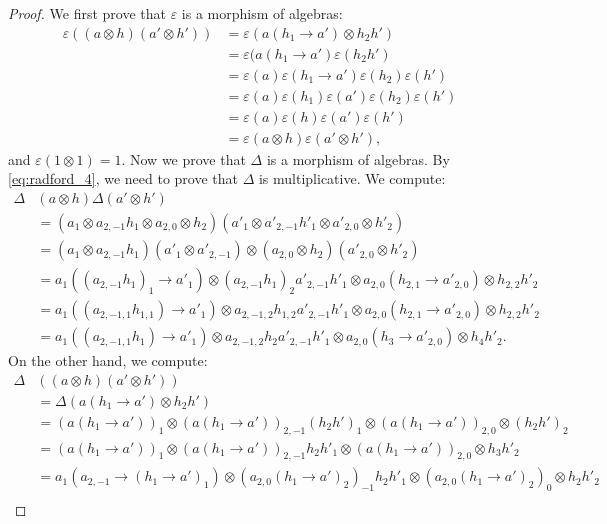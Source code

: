 \begin{proof}
We first prove that $\varepsilon$ is a morphism of algebras: 
\begin{align*}
\varepsilon((a\otimes h)(a'\otimes h')) & =\varepsilon(a(h_{1}\to a')\otimes h_{2}h')\\
 & =\varepsilon(a(h_{1}\to a')\varepsilon(h_{2}h')\\
 & =\varepsilon(a)\varepsilon(h_{1}\to a')\varepsilon(h_{2})\varepsilon(h')\\
 & =\varepsilon(a)\varepsilon(h_{1})\varepsilon(a')\varepsilon(h_{2})\varepsilon(h')\\
 & =\varepsilon(a)\varepsilon(h)\varepsilon(a')\varepsilon(h')\\
 & =\varepsilon(a\otimes h)\varepsilon(a'\otimes h'),
 \end{align*}
and $\varepsilon(1\otimes1)=1$.  Now we prove that $\Delta$ is a morphism of
algebras. By \eqref{eq:radford_4}, we need to prove that $\Delta$ is
multiplicative. We compute:
\begin{align*}
\Delta & (a\otimes h)\Delta(a'\otimes h')\\
 & =(a_{1}\otimes a_{2,-1}h_{1}\otimes a_{2,0}\otimes h_{2})(a'_{1}\otimes a'_{2,-1}h'_{1}\otimes a'_{2,0}\otimes h'_{2})\\
 & =(a_{1}\otimes a_{2,-1}h_{1})(a'_{1}\otimes a'_{2,-1})\otimes(a_{2,0}\otimes h_{2})(a'_{2,0}\otimes h'_{2})\\
 & =a_{1}((a_{2,-1}h_{1})_{1}\to a'_{1})\otimes(a_{2,-1}h_{1})_{2}a'_{2,-1}h'_{1}\otimes a_{2,0}(h_{2,1}\to a'_{2,0})\otimes h_{2,2}h'_{2}\\
 & =a_{1}((a_{2,-1,1}h_{1,1})\to a'_{1})\otimes a_{2,-1,2}h_{1,2}a'_{2,-1}h'_{1}\otimes a_{2,0}(h_{2,1}\to a'_{2,0})\otimes h_{2,2}h'_{2}\\
 & =a_{1}((a_{2,-1,1}h_{1})\to a'_{1})\otimes a_{2,-1,2}h_{2}a'_{2,-1}h'_{1}\otimes a_{2,0}(h_{3}\to a'_{2,0})\otimes h_{4}h'_{2}.\end{align*}
On the other hand, we compute:
\begin{align*}
\Delta & ((a\otimes h)(a'\otimes h'))\\
 & =\Delta(a(h_{1}\to a')\otimes h_{2}h')\\
 & =(a(h_{1}\to a'))_{1}\otimes(a(h_{1}\to a'))_{2,-1}(h_{2}h')_{1}\otimes(a(h_{1}\to a'))_{2,0}\otimes(h_{2}h')_{2}\\
 & =(a(h_{1}\to a'))_{1}\otimes(a(h_{1}\to a'))_{2,-1}h_{2}h'_{1}\otimes(a(h_{1}\to a'))_{2,0}\otimes h_{3}h'_{2}\\
 & =a_{1}(a_{2,-1}\to(h_{1}\to a')_{1})\otimes(a_{2,0}(h_{1}\to a')_{2})_{-1}h_{2}h'_{1}\otimes(a_{2,0}(h_{1}\to a')_{2})_{0}\otimes h_{2}h'_{2}\\

\end{align*}
\end{proof}
